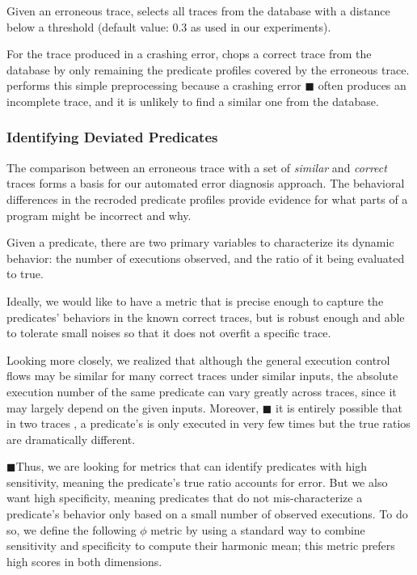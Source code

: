 Given an erroneous trace, \ourtool selects all traces from the database
with a distance below a threshold (default value: 0.3 as used in our
experiments).

For the trace produced in a crashing error, \ourtool 
chops a correct trace from the database by only remaining the predicate
profiles covered by the erroneous trace. \ourtool performs
this simple preprocessing because a crashing error $\blacksquare$
often produces an incomplete trace, and it is unlikely
to find a similar one from the database.


\subsubsection{Identifying Deviated Predicates}
\label{sec:deviation}


The comparison between an erroneous trace with a set
of \textit{similar} and \textit{correct} traces forms a basis for our
automated error diagnosis approach. 
The behavioral differences in the recroded predicate profiles provide evidence for what parts of a program might be
incorrect and why. %

Given a predicate, there are two primary variables to
characterize its dynamic behavior: the number of executions
observed, and the ratio of it being evaluated to true.


Ideally, we would like to have a metric that
is precise enough to capture the predicates' behaviors
in the known correct traces, but is robust enough and
able to tolerate small noises so that it does
not overfit a specific trace.

Looking more closely, we realized that although
the general execution control flows may be similar for many correct
traces under similar inputs, the absolute execution number of the same predicate
can vary greatly across traces, since it may
largely depend on the given inputs. Moreover, $\blacksquare$ it is entirely
possible that in two traces , a predicate's is only executed
in very few times but the true ratios are dramatically different.



$\blacksquare$Thus, we are looking for metrics that can identify
predicates with high sensitivity, meaning the predicate's true
ratio accounts for error. But we also want
high specificity, meaning predicates that do not mis-characterize
a predicate's behavior only based on a small number of
observed executions. To do so, we define the following
$\phi$ metric by using a standard way to
combine sensitivity and specificity to compute their
harmonic mean; this metric prefers high scores in both dimensions. 

